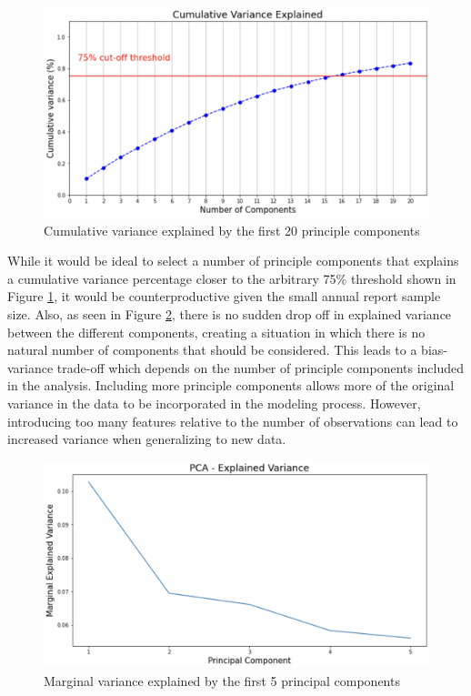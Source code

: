 \documentclass{article}
\begin{document}
\begin{figure}[ht]
    \centering
    \includegraphics[width = 0.7\linewidth]{PCA_cum_var_plot}
    \caption{Cumulative variance explained by the first 20 principle components}
    \label{fig:PCA_cum_var_plot}
\end{figure}

While it would be ideal to select a number of principle components that explains a cumulative variance percentage closer to the arbitrary 75\% threshold shown in Figure \ref{fig:PCA_cum_var_plot}, it would be counterproductive given the small annual report sample size. Also, as seen in Figure \ref{fig:PCA_explainedvariance}, there is no sudden drop off in explained variance between the different components, creating a situation in which there is no natural number of components that should be considered. This leads to a bias-variance trade-off which depends on the number of principle components included in the analysis. Including more principle components allows more of the original variance in the data to be incorporated in the modeling process. However, introducing too many features relative to the number of observations can lead to increased variance when generalizing to new data.

\begin{figure}[ht]
    \centering
    \includegraphics[width = 0.7\linewidth]{PCA_explainedvariance}
    \caption{Marginal variance explained by the first 5 principal components }
    \label{fig:PCA_explainedvariance}
\end{figure}
\end{document}
